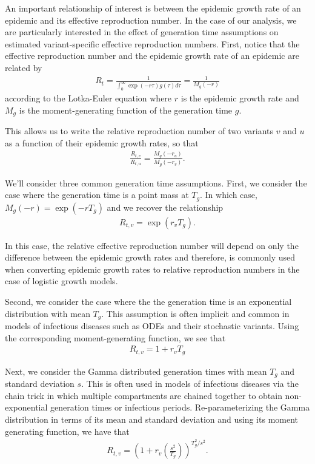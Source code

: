 \documentclass[11pt,oneside,letterpaper]{article}
\begin{document}
An important relationship of interest is between the epidemic growth rate of an epidemic and its effective reproduction number.
In the case of our analysis, we are particularly interested in the effect of generation time assumptions on estimated variant-specific effective reproduction numbers.
First, notice that the effective reproduction number and the epidemic growth rate of an epidemic are related by
\begin{align*}
R_{t} = \frac{1}{\int_{0}^{\infty} \exp(-r\tau)g(\tau)d\tau} = \frac{1}{M_{g}(-r)}
\end{align*}
according to the Lotka-Euler equation \cite{Wallinga2006} where $r$ is the epidemic growth rate and $M_{g}$ is the moment-generating function of the generation time $g$.

This allows us to write the relative reproduction number of two variants $v$ and $u$ as a function of their epidemic growth rates, so that
\begin{align*}
\frac{R_{t,v}}{R_{t,u}} = \frac{M_{g}(-r_{u})}{M_{g}(-r_{v})}.
\end{align*}

We'll consider three common generation time assumptions. First, we consider the case where the generation time is a point mass at $T_{g}$. In which case, $M_{g}(-r) = \exp(-r T_{g})$ and we recover the relationship
\begin{align*}
R_{t,v} = \exp(r_{v}T_{g}).
\end{align*}

In this case, the relative effective reproduction number will depend on only the difference between the epidemic growth rates and therefore, is commonly used when converting epidemic growth rates to relative reproduction numbers in the case of logistic growth models.

Second, we consider the case where the the generation time is an exponential distribution with mean $T_{g}$. This assumption is often implicit and common in models of infectious diseases such as ODEs and their stochastic variants. Using the corresponding moment-generating function, we see that
\begin{align*}
R_{t,v} = 1 + r_{v} T_{g}
\end{align*}

Next, we consider the Gamma distributed generation times with mean $T_{g}$ and standard deviation $s$.
This is often used in models of infectious diseases via the chain trick in which multiple compartments are chained together to obtain non-exponential generation times or infectious periods.
Re-parameterizing the Gamma distribution in terms of its mean and standard deviation and using its moment generating function, we have that
\begin{align*}
R_{t,v} = \left(1 + r_{v}  \left(\frac{s^{2}}{T_{g}}\right) \right)^{T_{g}^{2} / s^{2}}.
\end{align*}
\end{document}
